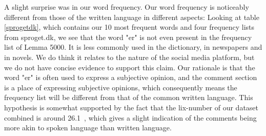 A slight surprise was in our word frequency. Our word frequency is noticeably different from those of the written language in different aspects: Looking at table \ref{sprogetdk}, which contains our 10 most frequent words and four frequency lists from sproget.dk\cite{sprogetdk}, we see that the word "er" is not even present in the frequency list of Lemma 5000. It is less commonly used in the dictionary, in newspapers and in novels. We do think it relates to the nature of the social media platform, but we do not have concise evidence to support this claim. Our rationale is that the word "er" is often used to express a subjective opinion, and the comment section is a place of expressing subjective opinions, which consequently means the frequency list will be different from that of the common written language. This hypothesis is somewhat supported by the fact that the lix-number of our dataset combined is around 26.1~, which gives a slight indication of the comments being more akin to spoken language than written language.

